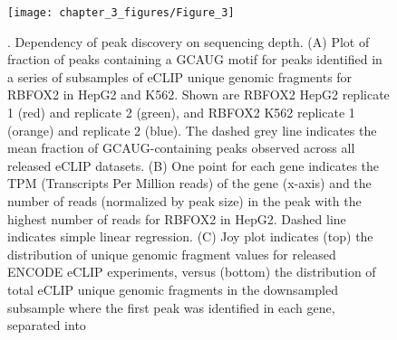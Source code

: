 \begin{figure}[ht]
  \centering
  \texttt{[image: chapter\_3\_figures/Figure\_3]}
  \caption[Figure 3]{. Dependency of peak discovery on sequencing depth. (A) Plot of fraction of peaks containing a GCAUG motif for peaks identified in a series of subsamples of eCLIP unique genomic fragments for RBFOX2 in HepG2 and K562. Shown are RBFOX2 HepG2 replicate 1 (red) and replicate 2 (green), and RBFOX2 K562 replicate 1 (orange) and replicate 2 (blue). The dashed grey line indicates the mean fraction of GCAUG-containing peaks observed across all released eCLIP datasets. (B) One point for each gene indicates the TPM (Transcripts Per Million reads) of the gene (x-axis) and the number of reads (normalized by peak size) in the peak with the highest number of reads for RBFOX2 in HepG2. Dashed line indicates simple linear regression. (C) Joy plot indicates (top) the distribution of unique genomic fragment values for released ENCODE eCLIP experiments, versus (bottom) the distribution of total eCLIP unique genomic fragments in the downsampled subsample where the first peak was identified in each gene, separated into}
  \label{fig:Figure_3}
\end{figure}

